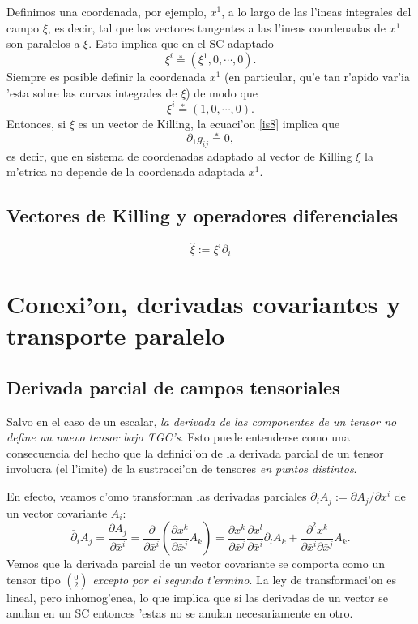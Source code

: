 Definimos una coordenada, por ejemplo, $x^1$, a lo largo de las l'ineas integrales del campo $\xi$, es decir, tal que los vectores tangentes a las l'ineas coordenadas de $x^1$ son paralelos a $\xi$. Esto implica que en el SC adaptado 
\begin{equation}
\xi^i\stackrel{*}{=}(\xi^1,0,\cdots,0).
\end{equation}
Siempre es posible definir la coordenada $x^1$ (en particular, qu'e tan r'apido var'ia 'esta sobre las curvas integrales de $\xi$) de modo que
\begin{equation}
\xi^i\stackrel{*}{=}(1,0,\cdots,0).
\end{equation}
Entonces, si $\xi$ es un vector de Killing, la ecuaci'on \eqref{is8} implica que
\begin{equation}
\partial_1g_{ij}\stackrel{*}{=}0,
\end{equation}
es decir, que en sistema de coordenadas adaptado al vector de Killing $\xi$ la m'etrica no depende de la coordenada adaptada $x^1$.

\subsection{Vectores de Killing y operadores diferenciales}
\begin{equation}
\hat{\xi}:=\xi^i\partial_i
\end{equation}

\section{Conexi'on, derivadas covariantes y transporte paralelo}

\subsection{Derivada parcial de campos tensoriales}

Salvo en el caso de un escalar, \textit{la derivada de las componentes de un tensor no define un nuevo tensor bajo TGC's}. Esto puede entenderse como una consecuencia del hecho que la definici'on de la derivada parcial de un tensor involucra (el l'imite) de la sustracci'on de tensores \textit{en puntos distintos}.

En efecto, veamos c'omo transforman las derivadas parciales $\partial_i
A_j:={\partial A_j}/{\partial x^i}$ de un vector covariante $A_i$:
\begin{equation}
\bar{\partial}_i\bar{A}_j=\frac{\partial \bar{A}_j}{\partial
\bar{x}^i}=\frac{\partial }{\partial \bar{x}^i}\left(\frac{\partial x^k
}{\partial\bar{x}^j }A_k \right)
=\frac{\partial x^k }{\partial\bar{x}^j }\frac{\partial x^l }{\partial\bar{x}^i}
\partial_l A_k +\frac{\partial^2 x^k }{\partial\bar
{x}^i \partial\bar{x}^j }A_k . \label{ord2}
\end{equation}
Vemos que la derivada parcial de un vector covariante se comporta como un tensor tipo $(_2^0)$ \textit{excepto por el segundo t'ermino}. La ley de
transformaci'on es lineal, pero inhomog'enea, lo que implica que si las
derivadas de un vector se anulan en un SC entonces 'estas no se anulan
necesariamente en otro.

